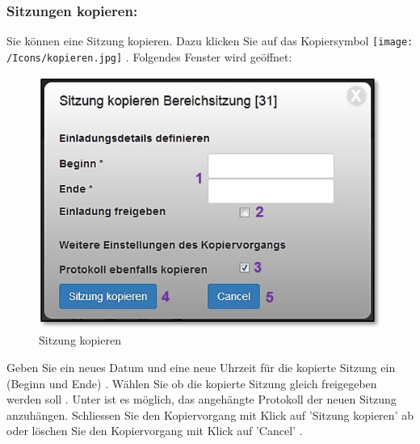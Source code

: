 \subsubsection{Sitzungen kopieren:} 
\label{bkm:Ref2017112701}

Sie können eine Sitzung kopieren. Dazu klicken Sie auf das Kopiersymbol \texttt{[image: /Icons/kopieren.jpg]} . Folgendes Fenster wird geöffnet: 

\pagebreak

\begin{figure}   %
  \vspace{-20pt}      %
  \begin{center}
    \includegraphics[width=1\linewidth]{../chapters/05_Sitzungswesen/pictures/5_SitzungKopieren.jpg}
  \end{center}
  \vspace{-20pt}
  \caption{Sitzung kopieren}
  \vspace{-10pt}
\end{figure}

Geben Sie ein neues Datum und eine neue Uhrzeit für die kopierte Sitzung ein (Beginn und Ende) . Wählen Sie ob die kopierte Sitzung gleich freigegeben werden soll . Unter  ist es möglich, das angehängte Protokoll der neuen Sitzung anzuhängen. Schliessen Sie den Kopiervorgang mit Klick auf 'Sitzung kopieren'  ab oder löschen  Sie den Kopiervorgang mit Klick auf 'Cancel' .

\vspace{\baselineskip}

